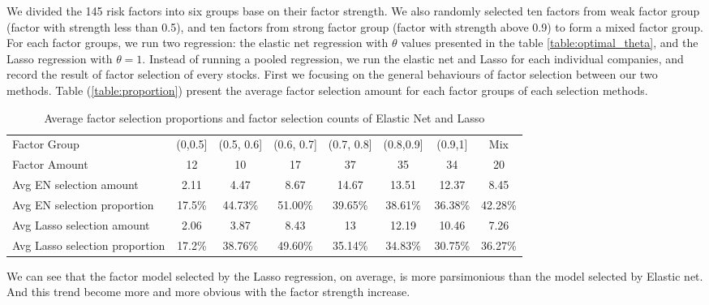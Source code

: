 We divided the 145 risk factors into six groups base on their factor strength.
We also randomly selected ten factors from  weak factor group (factor with strength less than 0.5), and ten factors from strong factor group (factor with strength above 0.9) to form a mixed factor group.
For each factor groups, we run two regression: the elastic net regression with $\theta$ values presented in the table \ref{table:optimal_theta}, and the Lasso regression with $\theta = 1$.
Instead of running a pooled regression, we run the elastic net and Lasso for each individual companies, and record the result of factor selection of every stocks.
First we focusing on the general behaviours of factor selection between our two methods.
Table (\ref{table:proportion}) present the average factor selection amount for each factor groups of each selection methods.
\begin{table}[h]
	\centering
		\caption{Average factor selection proportions and factor selection counts of Elastic Net and Lasso}
			\label{table:select_prop}
	\begin{tabular}{l|ccccccc}
		\hline
		\hline
		Factor Group                   & (0,0.5] & (0.5, 0.6]& (0.6, 0.7] & (0.7, 0.8] & (0.8,0.9] & (0.9,1] & Mix \\
		Factor Amount                  & 12            & 10               & 17               & 37               & 35              & 34            & 20  \\ \hline
		Avg EN selection amount        & 2.11          & 4.47             & 8.67             & 14.67            & 13.51           & 12.37         & 8.45                    \\
		Avg EN selection proportion    & 17.5\%        & 44.73\%          & 51.00\%          & 39.65\%          & 38.61\%         & 36.38\%       & 42.28\%                 \\
		Avg Lasso selection amount     & 2.06          & 3.87             & 8.43             & 13               & 12.19           & 10.46         & 7.26                    \\
		Avg Lasso selection proportion & 17.2\%        & 38.76\%          & 49.60\%          & 35.14\%          & 34.83\%         & 30.75\%       & 36.27\%                 \\ \hline\hline
	\end{tabular}
\end{table}
We can see that the factor model selected by the Lasso regression, on average, is more parsimonious than the model selected by Elastic net.
And this trend become more and more obvious with the factor strength increase.
